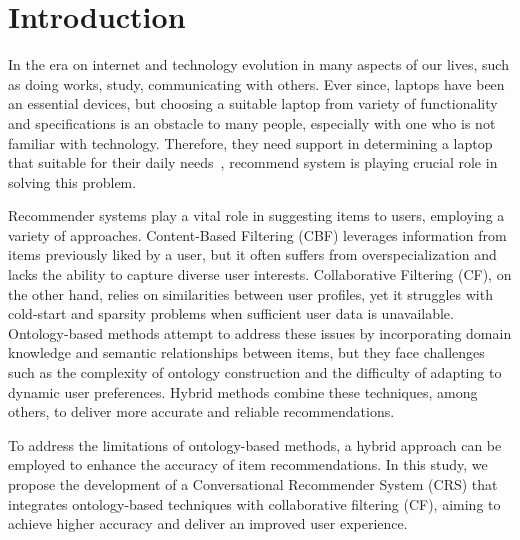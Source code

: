 \section{Introduction}
In the era on internet and technology evolution in many aspects of our lives, such as doing works, study, communicating with others. Ever since, laptops have been an essential devices, but choosing a suitable laptop from variety of functionality and specifications is an obstacle to many people, especially with one who is not familiar with technology. Therefore, they need support in determining a laptop that suitable for their daily needs~\parencite{baizal2016}, recommend system is playing crucial role in solving this problem.

Recommender systems play a vital role in suggesting items to users, employing a variety of approaches. Content-Based Filtering (CBF) leverages information from items previously liked by a user, but it often suffers from overspecialization and lacks the ability to capture diverse user interests. Collaborative Filtering (CF), on the other hand, relies on similarities between user profiles, yet it struggles with cold-start and sparsity problems when sufficient user data is unavailable. Ontology-based methods attempt to address these issues by incorporating domain knowledge and semantic relationships between items, but they face challenges such as the complexity of ontology construction and the difficulty of adapting to dynamic user preferences. Hybrid methods combine these techniques, among others, to deliver more accurate and reliable recommendations.

To address the limitations of ontology-based methods, a hybrid approach can be employed to enhance the accuracy of item recommendations. In this study, we propose the development of a Conversational Recommender System (CRS) that integrates ontology-based techniques with collaborative filtering (CF), aiming to achieve higher accuracy and deliver an improved user experience.